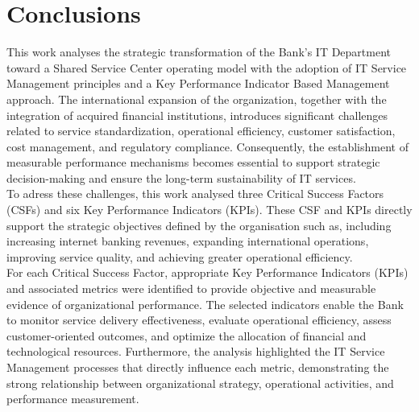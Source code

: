 \chapter{Conclusions}
\label{cap:conclusions}


This work analyses the strategic transformation of the Bank's IT Department toward a Shared Service Center operating model with the adoption of IT Service Management principles and a Key Performance Indicator Based Management approach. The international expansion of the organization, together with the integration of acquired financial institutions, introduces significant challenges related to service standardization, operational efficiency, customer satisfaction, cost management, and regulatory compliance. Consequently, the establishment of measurable performance mechanisms becomes essential to support strategic decision-making and ensure the long-term sustainability of IT services. \\

To adress these challenges, this work analysed three Critical Success Factors (CSFs) and six Key Performance Indicators (KPIs). These CSF and KPIs directly support the strategic objectives defined by the organisation such as, including increasing internet banking revenues, expanding international operations, improving service quality, and achieving greater operational efficiency. \\

For each Critical Success Factor, appropriate Key Performance Indicators (KPIs) and associated metrics were identified to provide objective and measurable evidence of organizational performance. The selected indicators enable the Bank to monitor service delivery effectiveness, evaluate operational efficiency, assess customer-oriented outcomes, and optimize the allocation of financial and technological resources. Furthermore, the analysis highlighted the IT Service Management processes that directly influence each metric, demonstrating the strong relationship between organizational strategy, operational activities, and performance measurement.


